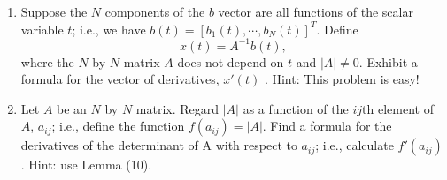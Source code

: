 \documentclass[10pt]{article}
\renewcommand{\textit}{}
\begin{document}
\begin{enumerate}
{  $U$; i.e., $E$ and $U$ satisfy (28) and (29) in the text above.}
\item \textit{Suppose the $N$ components of the $b$ vector are all functions
    of the scalar variable $t$; i.e., we have $b(t) = [b_1(t),\cdots,
    b_N(t)]^T$.  Define }
  \[ x(t) = A^{-1} b(t), \] 
  \textit{where the $N$ by $N$ matrix $A$ does not
    depend on $t$ and $|A|\neq 0$.  Exhibit a formula for the vector of
    derivatives, $x'(t)$ .  Hint:  This problem is easy!}
\item \textit{Let $A$ be an $N$ by $N$ matrix.  Regard $|A|$ as a
    function of the $ij$th element of $A$, $a_{ij}$; i.e., define the
    function $f(a_{ij}) = |A|$.  Find a formula for the derivatives of
    the determinant of A with respect to $a_{ij}$; i.e., calculate
    $f'(a_{ij})$.  Hint: use Lemma (10).}
\end{enumerate}
\end{document}
